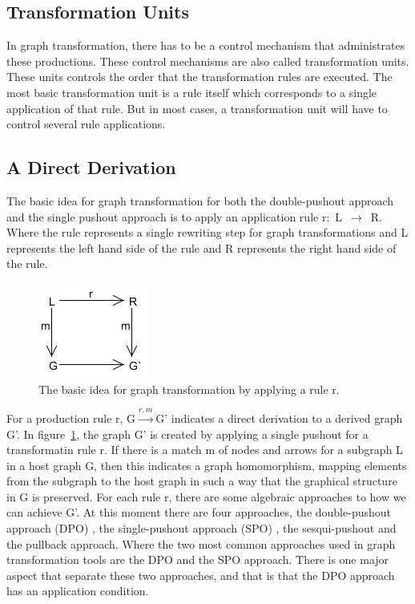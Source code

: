 \subsection{Transformation Units}
\noindent In graph transformation, there has to be a control mechanism that
administrates these productions. These control mechanisms are also called
transformation units. These units controls the order that the transformation
rules are executed. The most basic transformation unit is a rule itself which
corresponds to a single application of that rule. But in most cases, a
transformation unit will have to control several rule applications. 

\subsection{A Direct Derivation}
\noindent The basic idea for graph transformation for both the double-pushout
approach and the single pushout approach is to apply an application rule
\mbox{r: L $\longrightarrow$ R}. Where the rule represents a single rewriting
step for graph transformations and L represents the left hand side of the rule and R
represents the right hand side of the rule.

\begin{figure}[H]
	\centering
	\includegraphics[scale=0.7]{./Figures/GraphTransformationGeneral.png}
	\caption{The basic idea for graph transformation by applying a rule r.}
	\label{fig:GraphTransformationGeneral}
\end{figure}

For a production rule r, \mbox{G$\xrightarrow{r,m}$G'} indicates a direct
derivation to a derived graph G'. In
figure~\ref{fig:GraphTransformationGeneral}, the graph G' is created by
applying a single pushout for a transformatin rule r. If there is a match m of
nodes and arrows for a subgraph L in a host graph G, then this indicates a
graph homomorphism, mapping elements from the subgraph to the host graph in
such a way that the graphical structure in G is preserved. For each rule r,
there are some algebraic approaches to how we can achieve G'. At this moment
there are four approaches, the double-pushout approach (DPO) \cite{Loewe1997}, the
single-pushout approach (SPO) \cite{Ehrig1997}, the sesqui-pushout and the
pullback approach. Where the two most common approaches used in graph
transformation tools are the DPO and the SPO approach. There is one major
aspect that separate these two approaches, and that is that the DPO approach
has an application condition.

